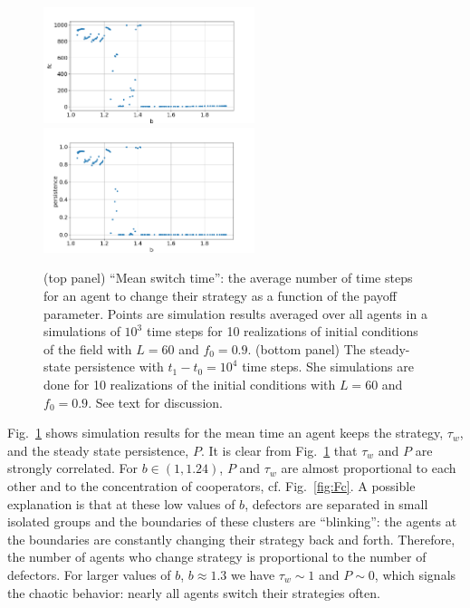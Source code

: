 \documentclass[a4paper]{jpconf}
\begin{document}
\begin{figure}[H]
\begin{center}
	\includegraphics[width=0.55\textwidth, keepaspectratio=True]{Change_time.png} \\
%
	\includegraphics[width=0.55\textwidth, keepaspectratio=True]{Persistence.png}
	\caption{(top panel) ``Mean switch time'': the average number of time steps for an agent to change their strategy as a function of the payoff parameter.  
	Points are simulation results averaged over all agents in a simulations of $10^{3}$ time steps for 10 realizations of initial conditions of the field with $L=60$ and $f_0 = 0.9$.
	(bottom panel) The steady-state persistence with $t_1 - t_0 = 10^4$ time steps. She simulations are done for 10 realizations of the initial conditions with $L=60$ and $f_0 = 0.9$. See text for discussion.
	}
	\label{fig:persistence}
\end{center}
\end{figure}


Fig.\ \ref{fig:persistence} shows simulation results for the mean time an agent keeps the strategy, $\tau_w$, and the steady state persistence, $P$. It is clear from Fig.\ \ref{fig:persistence} that $\tau_w$ and $P$ are
strongly correlated. For $b\in(1, 1.24)$,  $P$ and $\tau_w$ are almost proportional to each other and to the concentration of cooperators, cf. Fig.\ \ref{fig:Fc}. 
A possible explanation is that at these low values of $b$, defectors are separated in small isolated groups
and the boundaries of these clusters are ``blinking'': the agents at the boundaries are constantly changing their strategy back and forth. Therefore, the number of agents who change strategy is proportional to the number of defectors.  
For larger values of $b$, $b \approx 1.3$ we have $\tau_w \sim 1$ and $P\sim 0$, which signals the chaotic behavior: nearly all agents switch their strategies often. 
\end{document}
